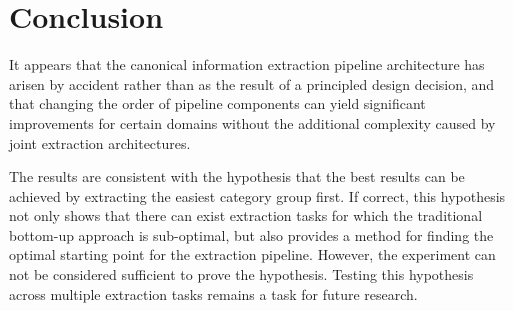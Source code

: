 \section{Conclusion}

It appears that the canonical information extraction pipeline architecture has arisen by accident rather than as the result of a principled design decision, and that changing the order of pipeline components can yield significant improvements for certain domains without the additional complexity caused by joint extraction architectures.

The results are consistent with the hypothesis that the best results can be achieved by extracting the easiest category group first. If correct, this hypothesis not only shows that there can exist extraction tasks for which the traditional bottom-up approach is sub-optimal, but also provides a method for finding the optimal starting point for the extraction pipeline. However, the experiment can not be considered sufficient to prove the hypothesis. Testing this hypothesis across multiple extraction tasks remains a task for future research.